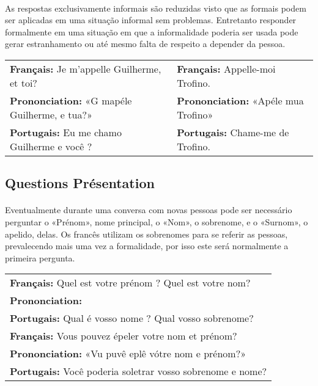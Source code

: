 \documentclass{article}
\begin{document}
        \paragraph{}As respostas exclusivamente informais são reduzidas visto que as formais podem ser aplicadas em uma situação informal sem problemas. Entretanto responder formalmente em uma situação em que a informalidade poderia ser usada pode gerar estranhamento ou até mesmo falta de respeito a depender da pessoa.
            
            \begin{center}
                \begin{tabular}{m{8cm} m{8cm}}
                    \textbf{Français:}      Je m’appelle Guilherme, et toi? & \textbf{Français:}      Appelle-moi Trofino.\\
                    \textbf{Prononciation:} «G mapéle Guilherme, e tua?»    & \textbf{Prononciation:} «Apéle mua Trofino»\\
                    \textbf{Portugais:}     Eu me chamo Guilherme e você ?  & \textbf{Portugais:}     Chame-me de Trofino.\\
                \end{tabular}
            \end{center}

    \subsection{Questions Présentation}
        \paragraph{}Eventualmente durante uma conversa com novas pessoas pode ser necessário perguntar o «Prénom», nome principal, o «Nom», o sobrenome, e o «Surnom», o apelido, delas. Os francês utilizam os sobrenomes para se referir as pessoas, prevalecendo mais uma vez a formalidade, por isso este será normalmente a primeira pergunta.
                 
            \begin{center}
                \begin{tabular}{l}
                    \textbf{Français:}      Quel est votre prénom ? Quel est votre nom?\\
                    \textbf{Prononciation:} \\
                    \textbf{Portugais:}     Qual é vosso nome ? Qual vosso sobrenome?\\[2.5ex]
                    
                    \textbf{Français:}      Vous pouvez épeler votre nom et prénom?\\
                    \textbf{Prononciation:} «Vu puvê eplê vótre nom e prénom?»\\
                    \textbf{Portugais:}     Você poderia soletrar vosso sobrenome e nome?\\    
                \end{tabular}
            \end{center}
    
\end{document}
